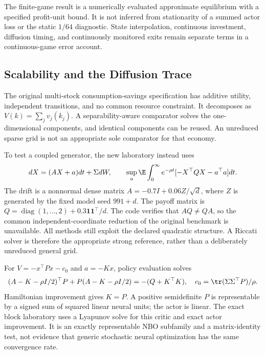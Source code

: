 The finite-game result is a numerically evaluated approximate equilibrium with a specified profit-unit bound. It is not inferred from stationarity of a summed actor loss or the static $1/64$ diagnostic. State interpolation, continuous investment, diffusion timing, and continuously monitored exits remain separate terms in a continuous-game error account.



\subsection{Scalability and the Diffusion Trace}\label{sec:scaling}
The original multi-stock consumption-savings specification has additive utility, independent transitions, and no common resource constraint. It decomposes as $V(k)=\sum_jv_j(k_j)$. A separability-aware comparator solves the one-dimensional components, and identical components can be reused. An unreduced sparse grid is not an appropriate sole comparator for that economy.

To test a coupled generator, the new laboratory instead uses
\begin{equation}\label{eq:lq}
 dX=(AX+a)dt+\Sigma dW,\qquad
 \sup_a\E\int_0^\infty e^{-\rho t}[-X^\top QX-a^\top a]dt.
\end{equation}
The drift is a nonnormal dense matrix $A=-0.7I+0.06Z/\sqrt d$, where $Z$ is generated by the fixed model seed $991+d$. The payoff matrix is $Q=\operatorname{diag}(1,\ldots,2)+0.3\bm1\bm1^\top/d$. The code verifies that $AQ\ne QA$, so the common independent-coordinate reduction of the original benchmark is unavailable. All methods still exploit the declared quadratic structure. A Riccati solver is therefore the appropriate strong reference, rather than a deliberately unreduced general grid.

For $V=-x^\top Px-c_0$ and $a=-Kx$, policy evaluation solves
\begin{equation}\label{eq:lyapunov}
 (A-K-\rho I/2)^\top P+P(A-K-\rho I/2)=-(Q+K^\top K),
 \quad c_0=\tr(\Sigma\Sigma^\top P)/\rho.
\end{equation}
Hamiltonian improvement gives $K=P$. A positive semidefinite $P$ is representable by a signed sum of squared linear neural units; the actor is linear. The exact block laboratory uses a Lyapunov solve for this critic and exact actor improvement. It is an exactly representable NBO subfamily and a matrix-identity test, not evidence that generic stochastic neural optimization has the same convergence rate.

